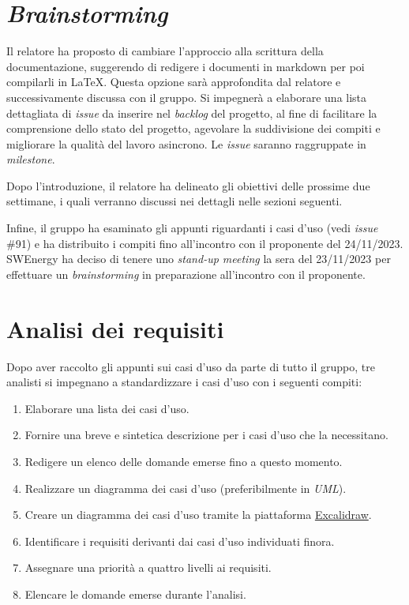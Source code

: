 \section{\textit{Brainstorming}}

Il relatore ha proposto di cambiare l'approccio alla scrittura della
documentazione, suggerendo di redigere i documenti in markdown per poi
compilarli in \LaTeX{}. Questa opzione sarà approfondita dal relatore e
successivamente discussa con il gruppo. Si impegnerà a elaborare una lista
dettagliata di \textit{issue} da inserire nel \textit{backlog} del progetto, al
fine di facilitare la comprensione dello stato del progetto, agevolare la
suddivisione dei compiti e migliorare la qualità del lavoro asincrono. Le
\textit{issue} saranno raggruppate in \textit{milestone}.

Dopo l'introduzione, il relatore ha delineato gli obiettivi delle prossime due
settimane, i quali verranno discussi nei dettagli nelle sezioni seguenti.

Infine, il gruppo ha esaminato gli appunti riguardanti i casi d'uso (vedi
\textit{issue} \#91) e ha distribuito i compiti fino all'incontro con il
proponente del 24/11/2023. SWEnergy ha deciso di tenere uno \textit{stand-up
	meeting} la sera del 23/11/2023 per effettuare un \textit{brainstorming} in
preparazione all'incontro con il proponente.

\section{Analisi dei requisiti}

Dopo aver raccolto gli appunti sui casi d'uso da parte di tutto il gruppo, tre
analisti si impegnano a standardizzare i casi d'uso con i seguenti compiti:

\begin{enumerate}
	\item Elaborare una lista dei casi d'uso.
	\item Fornire una breve e sintetica descrizione per i casi d'uso che la
	      necessitano.
	\item Redigere un elenco delle domande emerse fino a questo momento.
	\item Realizzare un diagramma dei casi d'uso (preferibilmente in
	      \textit{UML}).
	\item Creare un diagramma dei casi d'uso tramite la piattaforma
	      \href{https://excalidraw.com/}{Excalidraw}.
	\item Identificare i requisiti derivanti dai casi d'uso individuati finora.
	\item Assegnare una priorità a quattro livelli ai requisiti.
	\item Elencare le domande emerse durante l'analisi.
\end{enumerate}

